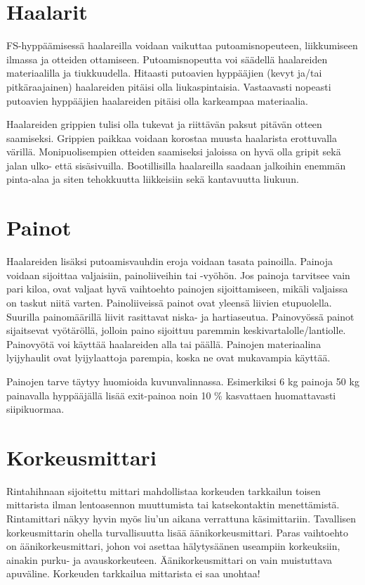 \section{ Haalarit }
\label{fs-hyppaajan-varusteet-haalarit}


FS-hyppäämisessä haalareilla voidaan vaikuttaa putoamisnopeuteen, liikkumiseen ilmassa ja otteiden ottamiseen. Putoamisnopeutta voi säädellä haalareiden materiaalilla ja tiukkuudella. Hitaasti putoavien hyppääjien (kevyt ja/tai pitkäraajainen) haalareiden pitäisi olla liukaspintaisia. Vastaavasti nopeasti putoavien hyppääjien haalareiden pitäisi olla karkeampaa materiaalia. 


Haalareiden grippien tulisi olla tukevat ja riittävän paksut pitävän otteen saamiseksi. Grippien paikkaa voidaan korostaa muusta haalarista erottuvalla värillä. Monipuolisempien otteiden saamiseksi jaloissa on hyvä olla gripit sekä jalan ulko- että sisäsivuilla. Bootillisilla haalareilla saadaan jalkoihin enemmän pinta-alaa ja siten tehokkuutta liikkeisiin sekä kantavuutta liukuun. 

\section{ Painot }
\label{fs-hyppaajan-varusteet-painot}


Haalareiden lisäksi putoamisvauhdin eroja voidaan tasata painoilla. Painoja voidaan sijoittaa valjaisiin, painoliiveihin tai -vyöhön. Jos painoja tarvitsee vain pari kiloa, ovat valjaat hyvä vaihtoehto painojen sijoittamiseen, mikäli valjaissa on taskut niitä varten. Painoliiveissä painot ovat yleensä liivien etupuolella. Suurilla painomäärillä liivit rasittavat niska- ja hartiaseutua. Painovyössä painot sijaitsevat vyötäröllä, jolloin paino sijoittuu paremmin keskivartalolle/lantiolle. Painovyötä voi käyttää haalareiden alla tai päällä. Painojen materiaalina lyijyhaulit ovat lyijylaattoja parempia, koska ne ovat mukavampia käyttää. 


Painojen tarve täytyy huomioida kuvunvalinnassa. Esimerkiksi 6 kg painoja 50 kg painavalla hyppääjällä lisää exit-painoa noin 10 \% kasvattaen huomattavasti siipikuormaa. 

\section{ Korkeusmittari }
\label{fs-hyppaajan-varusteet-korkeusmittari}


Rintahihnaan sijoitettu mittari mahdollistaa korkeuden tarkkailun toisen mittarista ilman lentoasennon muuttumista tai katsekontaktin menettämistä. Rintamittari näkyy hyvin myös liu'un aikana verrattuna käsimittariin. Tavallisen korkeusmittarin ohella turvallisuutta lisää äänikorkeusmittari. Paras vaihtoehto on äänikorkeusmittari, johon voi asettaa hälytysäänen useampiin korkeuksiin, ainakin purku- ja avauskorkeuteen. Äänikorkeusmittari on vain muistuttava apuväline. Korkeuden tarkkailua mittarista ei saa unohtaa! 


